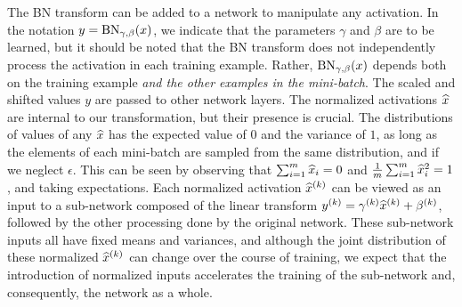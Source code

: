 \documentclass[twocolumn]{article}
\begin{document}
The BN transform  can be added to a network to manipulate any activation. In the notation $y = \BN{x}{\gamma,\beta}$, we indicate that the parameters $\gamma$ and $\beta$ are to be learned, but it should be noted that the BN transform does not independently process the activation in each training example. Rather,  $\BN{x}{\gamma,\beta}$ depends both on the training example {\em and the other examples in the mini-batch}.
The scaled and shifted values $y$  are passed to other network layers. The normalized activations $\xhat$ are internal to our transformation, but their presence is crucial. The distributions of  values of any  $\xhat$ has the
expected value of $0$ and the variance of $1$, as long as the elements of each mini-batch are 
 sampled from the same distribution, and if we neglect $\epsilon$.  This can be seen by observing that $\sum_{i=1}^m \xhat_i = 0$ and
$\frac{1}{m}\sum_{i=1}^m \xhat_i^2 = 1$, and  taking expectations. Each normalized activation $\xhat^\kk$ can be viewed as an input to a sub-network composed of the linear transform $y^\kk=\gamma^\kk\xhat^\kk+\beta^\kk$, followed by the other processing done by the original network. These sub-network inputs all have fixed means and variances, and although the joint distribution of these normalized $\xhat^\kk$ can change over the course of  training, we expect that the introduction of  normalized inputs accelerates the training of the sub-network and, consequently, the network as a whole. 
  
\end{document}

